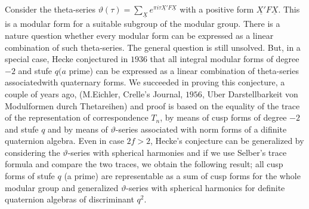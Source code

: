 Consider the theta-series $\vartheta(\tau)=\sum
\limits_{\underline{X}}e^{\pi i \tau \underline{X'}F \underline{X}}$
with a positive form $\underline{X'}F\underline{X}$. This is a modular
form for a suitable subgroup of the modular group. There is a nature
question whether every modular form can be expressed as a linear
combination of such theta-series. The general question is still
unsolved. But, in a special case, Hecke conjectured in $1936$ that all
integral modular forms of degree $-2$ and stufe $q(a$ prime) can be
expressed as a linear combination of theta-series associated\pageoriginale with
quaternary forms. We succeeded in proving this conjecture, a couple of
years ago, (M.Eichler, Crelle's Journal, $1956$, Uber Darstellbarkeit
von Modulformen durch Thetareihen) and proof is based on the equality
of the trace of the representation of correspondence $T_n$, by means
of cusp forms of degree $-2$ and stufe $q$ and by means of
$\vartheta$-series associated with norm forms of a difinite quaternion
algebra. Even in case $2f >2$, Hecke's conjecture can be generalized
by considering the $\vartheta$-series with spherical harmonies and if
we use Selber's trace formula and compare the two traces, we obtain
the following result; all cusp forms of stufe $q$ (a prime) are
representable as a sum of cusp forms for the whole modular group and
generalized $\vartheta$-series with spherical harmonics for definite
quaternion algebras of discriminant $q^2$. 


